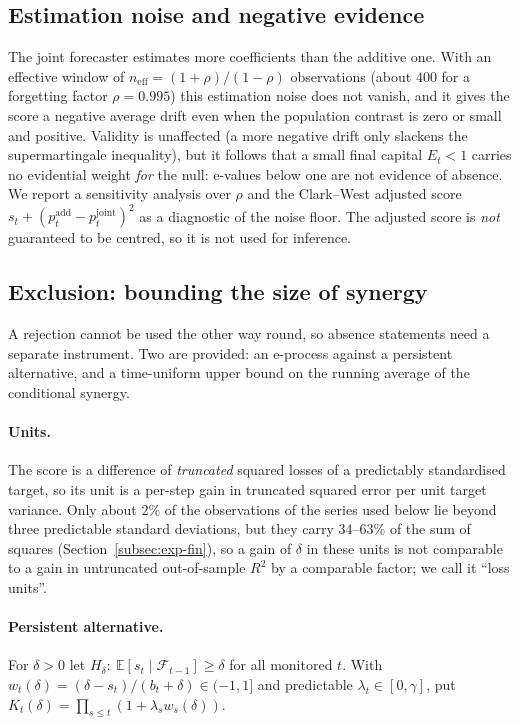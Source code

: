 \documentclass[pdflatex,sn-mathphys-ay]{sn-jnl}%
\theoremstyle{thmstyleone}%
\theoremstyle{thmstyletwo}%
\theoremstyle{thmstylethree}%
\newcommand{\E}{\mathbb{E}}
\newcommand{\F}{\mathcal{F}}
\begin{document}
\subsection{Estimation noise and negative evidence}\label{subsec:cw}

The joint forecaster estimates more coefficients than the additive one. With an effective window of
$n_{\mathrm{eff}}=(1+\rho)/(1-\rho)$ observations (about $400$ for a forgetting factor $\rho=0.995$)
this estimation noise does not vanish, and it gives the score a negative average drift
even when the population contrast is zero or small and positive. Validity is unaffected
(a more negative drift only slackens the supermartingale inequality), but it follows that a
small final capital $E_t<1$ carries no evidential weight \emph{for} the null: e-values below one are not
evidence of absence. We report a sensitivity analysis over $\rho$ and the Clark--West
adjusted score $s_t+(p^{\mathrm{add}}_t-p^{\mathrm{joint}}_t)^2$ \citep{clarkwest2007}
as a diagnostic of the noise floor. The adjusted score is \emph{not} guaranteed to be
centred, so it is not used for inference.

\subsection{Exclusion: bounding the size of synergy}\label{subsec:excl}

A rejection cannot be used the other way round, so absence statements need a separate instrument. Two are provided: an e-process against a
persistent alternative, and a time-uniform upper bound on the running average of the conditional synergy.

\paragraph{Units.} The score is a difference of \emph{truncated} squared losses of a predictably standardised target, so its unit is a per-step gain in truncated squared error
per unit target variance. Only about $2\%$ of the observations of the series used below lie beyond three predictable standard deviations, but they carry $34$--$63\%$ of the sum of squares
(Section~\ref{subsec:exp-fin}), so a gain of $\delta$ in these units is not comparable to a gain in untruncated out-of-sample $R^2$ by a comparable factor; we call it ``loss units''.

\paragraph{Persistent alternative.} For $\delta>0$ let
$H_\delta:\ \E[s_t\mid\F_{t-1}]\ge\delta$ for all monitored $t$.
With $w_t(\delta)=(\delta-s_t)/(b_t+\delta)\in(-1,1]$ and predictable $\lambda_t\in[0,\gamma]$, put $K_t(\delta)=\prod_{s\le t}(1+\lambda_sw_s(\delta))$.
\end{document}
